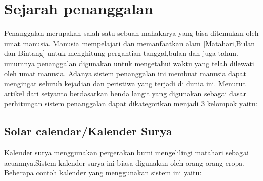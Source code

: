 

\section{Sejarah penanggalan}
  Penanggalan merupakan salah satu sebuah mahakarya yang bisa ditemukan oleh umat manusia. Manusia mempelajari dan memanfaatkan alam [Matahari,Bulan dan Bintang] untuk menghitung pergantian tanggal,bulan dan juga tahun.
umumnya penanggalan digunakan untuk mengetahui waktu yang telah dilewati oleh umat manusia. Adanya sistem penanggalan ini membuat manusia dapat mengingat seluruh kejadian dan peristiwa yang terjadi di dunia ini.
Menurut artikel dari setyanto berdasarkan benda langit yang digunakan sebagai dasar perhitungan sistem penanggalan dapat dikategorikan menjadi 3 kelompok yaitu:\cite{setyanto2015kriteria}

  \subsection{Solar calendar/Kalender Surya}
    Kalender surya menggunakan pergerakan bumi mengelilingi matahari sebagai acuannya.Sistem kalender surya ini biasa digunakan oleh orang-orang eropa. Beberapa contoh kalender yang menggunakan sistem ini yaitu:

